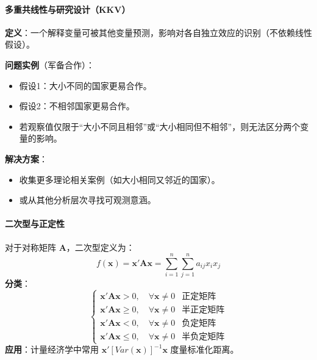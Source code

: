 \paragraph*{多重共线性与研究设计（KKV）}
\begin{flushleft}
	\textbf{定义}：一个解释变量可被其他变量预测，影响对各自独立效应的识别（不依赖线性假设）。
\end{flushleft}

\begin{flushleft}
	\textbf{问题实例}（军备合作）：
\end{flushleft}
\begin{itemize}
	\item 假设1：大小不同的国家更易合作。
	\item 假设2：不相邻国家更易合作。
	\item 若观察值仅限于``大小不同且相邻''或``大小相同但不相邻''，则无法区分两个变量的影响。
\end{itemize}

\begin{flushleft}
	\textbf{解决方案}：
\end{flushleft}
\begin{itemize}
	\item 收集更多理论相关案例（如大小相同又邻近的国家）。
	\item 或从其他分析层次寻找可观测意涵。
\end{itemize}

\paragraph*{二次型与正定性}
对于对称矩阵 $ \mathbf{A} $，二次型定义为：
\begin{equation}
f(\mathbf{x}) = \mathbf{x}' \mathbf{A} \mathbf{x} = \sum_{i=1}^n \sum_{j=1}^n a_{ij} x_i x_j
\end{equation}
\textbf{分类}：
\[
\begin{cases}
	\mathbf{x}' \mathbf{A} \mathbf{x} > 0, \quad \forall \mathbf{x} \neq 0 & \text{正定矩阵} \\
	\mathbf{x}' \mathbf{A} \mathbf{x} \geq 0, \quad \forall \mathbf{x} \neq 0 & \text{半正定矩阵} \\
	\mathbf{x}' \mathbf{A} \mathbf{x} < 0, \quad \forall \mathbf{x} \neq 0 & \text{负定矩阵} \\
	\mathbf{x}' \mathbf{A} \mathbf{x} \leq 0, \quad \forall \mathbf{x} \neq 0 & \text{半负定矩阵}
\end{cases}
\]
\textbf{应用}：计量经济学中常用 $ \mathbf{x}' [Var(\mathbf{x})]^{-1} \mathbf{x} $ 度量标准化距离。

